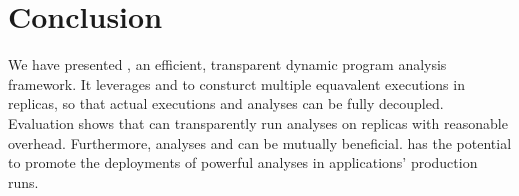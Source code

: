 \section{Conclusion} \label{sec:conclusion}

We have presented \xxx, an efficient, transparent dynamic program analysis 
framework. It leverages \smr and \dmt to consturct multiple equavalent 
executions in replicas, so that actual executions and analyses can be fully 
decoupled. Evaluation shows that \xxx can transparently run analyses on 
replicas with reasonable overhead. Furthermore, analyses and \xxx can be 
mutually beneficial. \xxx has the potential to promote the deployments of 
powerful analyses in applications' production runs.